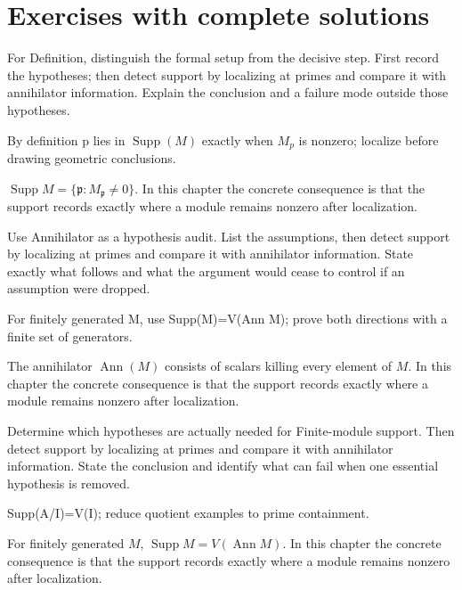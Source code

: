 \section{Exercises with complete solutions}

\begin{exercise}\label{exr:v16-01}
For Definition, distinguish the formal setup from the decisive step. First record the hypotheses; then detect support by localizing at primes and compare it with annihilator information. Explain the conclusion and a failure mode outside those hypotheses.
\end{exercise}
\begin{hint}
By definition p lies in \(\operatorname{Supp}(M)\) exactly when \(M_p\) is nonzero; localize before drawing geometric conclusions.
\end{hint}
\begin{solution}
$\operatorname{Supp}M=\{\mathfrak p:M_{\mathfrak p}\ne0\}$. In this chapter the concrete consequence is that the support records exactly where a module remains nonzero after localization.
\end{solution}

\begin{exercise}\label{exr:v16-02}
Use Annihilator as a hypothesis audit. List the assumptions, then detect support by localizing at primes and compare it with annihilator information. State exactly what follows and what the argument would cease to control if an assumption were dropped.
\end{exercise}
\begin{hint}
For finitely generated M, use Supp(M)=V(Ann M); prove both directions with a finite set of generators.
\end{hint}
\begin{solution}
The annihilator $\operatorname{Ann}(M)$ consists of scalars killing every element of $M$. In this chapter the concrete consequence is that the support records exactly where a module remains nonzero after localization.
\end{solution}

\begin{exercise}\label{exr:v16-03}
Determine which hypotheses are actually needed for Finite-module support. Then detect support by localizing at primes and compare it with annihilator information. State the conclusion and identify what can fail when one essential hypothesis is removed.
\end{exercise}
\begin{hint}
Supp(A/I)=V(I); reduce quotient examples to prime containment.
\end{hint}
\begin{solution}
For finitely generated $M$, $\operatorname{Supp}M=V(\operatorname{Ann}M)$. In this chapter the concrete consequence is that the support records exactly where a module remains nonzero after localization.
\end{solution}

